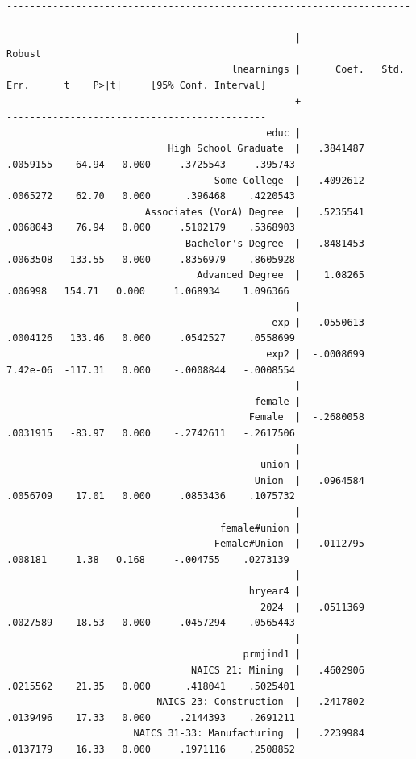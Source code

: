 \documentclass[
]{book}
\begin{document}
\begin{verbatim}
-------------------------------------------------------------------------------------------------------------------
                                                  |               Robust
                                       lnearnings |      Coef.   Std. Err.      t    P>|t|     [95% Conf. Interval]
--------------------------------------------------+----------------------------------------------------------------
                                             educ |
                            High School Graduate  |   .3841487   .0059155    64.94   0.000     .3725543     .395743
                                    Some College  |   .4092612   .0065272    62.70   0.000      .396468    .4220543
                        Associates (VorA) Degree  |   .5235541   .0068043    76.94   0.000     .5102179    .5368903
                               Bachelor's Degree  |   .8481453   .0063508   133.55   0.000     .8356979    .8605928
                                 Advanced Degree  |    1.08265    .006998   154.71   0.000     1.068934    1.096366
                                                  |
                                              exp |   .0550613   .0004126   133.46   0.000     .0542527    .0558699
                                             exp2 |  -.0008699   7.42e-06  -117.31   0.000    -.0008844   -.0008554
                                                  |
                                           female |
                                          Female  |  -.2680058   .0031915   -83.97   0.000    -.2742611   -.2617506
                                                  |
                                            union |
                                           Union  |   .0964584   .0056709    17.01   0.000     .0853436    .1075732
                                                  |
                                     female#union |
                                    Female#Union  |   .0112795    .008181     1.38   0.168     -.004755    .0273139
                                                  |
                                          hryear4 |
                                            2024  |   .0511369   .0027589    18.53   0.000     .0457294    .0565443
                                                  |
                                         prmjind1 |
                                NAICS 21: Mining  |   .4602906   .0215562    21.35   0.000      .418041    .5025401
                          NAICS 23: Construction  |   .2417802   .0139496    17.33   0.000     .2144393    .2691211
                      NAICS 31-33: Manufacturing  |   .2239984   .0137179    16.33   0.000     .1971116    .2508852

\end{verbatim}
\end{document}
